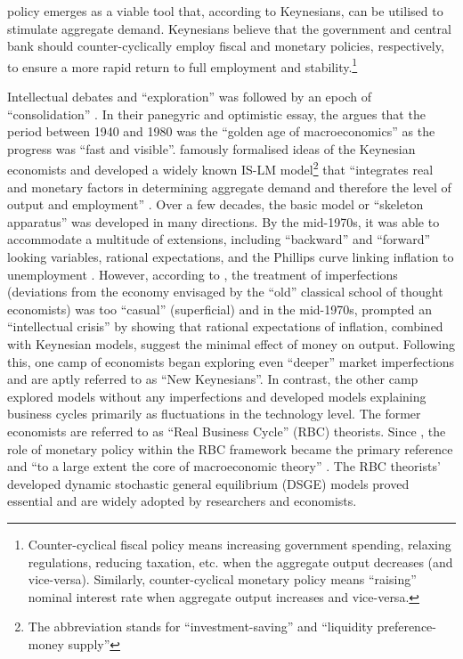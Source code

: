policy emerges as a viable tool that, according to Keynesians, can be utilised to stimulate aggregate demand. Keynesians believe that the government and central bank should counter-cyclically employ fiscal and monetary policies, respectively, to ensure a more rapid return to full employment and stability.\footnote{Counter-cyclical fiscal policy means increasing government spending, relaxing regulations, reducing taxation, etc. when the aggregate output decreases (and vice-versa). Similarly, counter-cyclical monetary policy means ``raising'' nominal interest rate when aggregate output increases and vice-versa.}

Intellectual debates and ``exploration'' was followed by an epoch of ``consolidation'' \textcite{blanchard_2000_what}. In their panegyric and optimistic essay, the \citereset\textcite{blanchard_2000_what} argues that the period between 1940 and 1980 was the ``golden age of macroeconomics'' \parencite[1379]{blanchard_2000_what} as the progress was ``fast and visible''. \textcite{hicks_1937_mr} famously formalised ideas of the Keynesian economists and developed a widely known IS-LM model\footnote{The abbreviation stands for ``investment-saving'' and ``liquidity preference-money supply''} that ``integrates real and monetary factors in determining aggregate demand and therefore the level of output and employment'' \parencite[90]{snowdon_1994_a}. Over a few decades, the basic model or ``skeleton apparatus'' \parencite[158]{hicks_1937_mr} was developed in many directions. By the mid-1970s, it was able to accommodate a multitude of extensions, including ``backward'' and ``forward'' looking variables, rational expectations, and the Phillips curve linking inflation to unemployment \parencite[1382]{blanchard_2000_what}. However, according to \citereset\textcite[1382]{blanchard_2000_what}, the treatment of imperfections (deviations from the economy envisaged by the ``old'' classical school of thought economists) was too ``casual'' (superficial) and in the mid-1970s, \textcite{sargent_1973_rational} prompted an ``intellectual crisis'' \parencite[1382]{blanchard_2000_what} by showing that rational expectations of inflation, combined with Keynesian models, suggest the minimal effect of money on output. Following this, one camp of economists began exploring even ``deeper'' market imperfections and are aptly referred to as ``New Keynesians''. In contrast, the other camp explored models without any imperfections and developed models explaining business cycles primarily as fluctuations in the technology level. The former economists are referred to as ``Real Business Cycle'' (RBC) theorists. Since \textcites{kydland_1982_time}{prescott_1986_theory}, the role of monetary policy within the RBC framework became the primary reference and ``to a large extent the core of macroeconomic theory'' \parencite[2]{jordigal_2015_monetary}. The RBC theorists' developed dynamic stochastic general equilibrium (DSGE) models proved essential and are widely adopted by researchers and economists.

